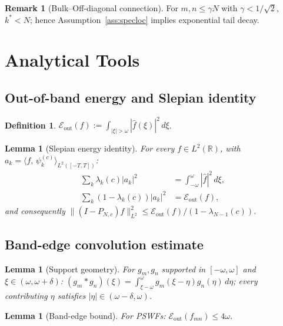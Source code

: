 \documentclass[12pt,a4paper]{amsart}
\newtheorem{lemma}[theorem]{Lemma}
\theoremstyle{definition}
\newtheorem{definition}[theorem]{Definition}
\newtheorem{remark}[theorem]{Remark}
\newcommand{\PN}{P_{N,c}}
\newcommand{\ip}[2]{\langle #1,\, #2\rangle}
\newcommand{\Eout}{\mathcal{E}_{\mathrm{out}}}
\begin{document}
\begin{remark}[Bulk--Off-diagonal connection]
\label{rem:bulk-od-connection}
For $m,n \le \gamma N$ with $\gamma < 1/\sqrt{2}$,
$k^* < N$; hence Assumption~\ref{ass:specloc} implies
exponential tail decay.
\end{remark}

\section{Analytical Tools}\label{sec:tools}

\subsection{Out-of-band energy and Slepian identity}

\begin{definition}\label{def:eout}
$\Eout(f) := \int_{|\xi|>\omega}|\hat f(\xi)|^2\,d\xi$.
\end{definition}

\begin{lemma}[Slepian energy identity]\label{lem:slepian}
For every $f\in L^2(\mathbb{R})$,
with $a_k = \ip{f}{\psi_k^{(c)}}_{L^2([-T,T])}$:
\begin{align}
  \textstyle\sum_k\lambda_k(c)|a_k|^2
  &= \textstyle\int_{-\omega}^{\omega}|\hat f|^2\,d\xi,
  \label{eq:sei-in}\\
  \textstyle\sum_k(1-\lambda_k(c))|a_k|^2
  &= \Eout(f),\label{eq:sei-out}
\end{align}
and consequently
$\|(I-\PN)f\|_{L^2}^2 \le \Eout(f)/(1-\lambda_{N-1}(c))$.
\end{lemma}

\subsection{Band-edge convolution estimate}

\begin{lemma}[Support geometry]\label{lem:geom}
For $g_m,g_n$ supported in $[-\omega,\omega]$ and
$\xi\in(\omega,\omega+\delta)$:
$(g_m*g_n)(\xi) = \int_{\xi-\omega}^{\omega}g_m(\xi-\eta)g_n(\eta)\,d\eta$;
every contributing $\eta$ satisfies $|\eta|\in(\omega-\delta,\omega)$.
\end{lemma}

\begin{lemma}[Band-edge bound]\label{lem:bandedge}
For PSWFs: $\Eout(f_{mn}) \le 4\omega$.
\end{lemma}
\end{document}
